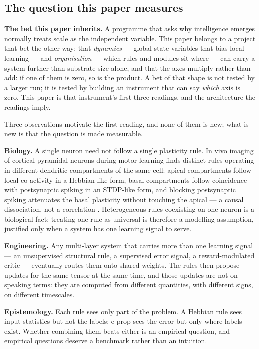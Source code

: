 \documentclass[11pt]{article}
\begin{document}
\subsection{The question this paper measures}

\textbf{The bet this paper inherits.} A programme that asks why intelligence
emerges normally treats scale as the independent variable. This paper belongs to a
project that bet the other way: that \emph{dynamics} --- global state variables
that bias local learning --- and \emph{organisation} --- which rules and modules
sit where --- can carry a system further than substrate size alone, and that the
axes multiply rather than add: if one of them is zero, so is the product. A bet of
that shape is not tested by a larger run; it is tested by building an instrument
that can say \emph{which} axis is zero. This paper is that instrument's first three
readings, and the architecture the readings imply.

Three observations motivate the first reading, and none of them is new; what is new
is that the question is made measurable.

\textbf{Biology.} A single neuron need not follow a single plasticity rule. In vivo imaging of
cortical pyramidal neurons during motor learning finds distinct rules operating in different
dendritic compartments of the same cell:
apical compartments follow local co-activity in a Hebbian-like form, basal compartments follow
coincidence with postsynaptic spiking in an STDP-like form, and blocking postsynaptic spiking
attenuates the basal plasticity without touching the apical --- a causal dissociation, not a
correlation \citep{wright2025distinct}. Heterogeneous rules coexisting on one neuron is a
biological fact; treating one rule as universal is therefore a modelling assumption, justified
only when a system has one learning signal to serve.

\textbf{Engineering.} Any multi-layer system that carries more than one learning signal --- an
unsupervised structural rule, a supervised error signal, a reward-modulated critic --- eventually
routes them onto shared weights. The rules then propose updates for the same tensor at the same
time, and those updates are not on speaking terms: they are computed from different quantities,
with different signs, on different timescales.

\textbf{Epistemology.} Each rule sees only part of the problem. A Hebbian rule sees input
statistics but not the labels; e-prop sees the error but only where labels exist. Whether
combining them beats either is an empirical question, and empirical questions deserve a benchmark
rather than an intuition.
\end{document}
